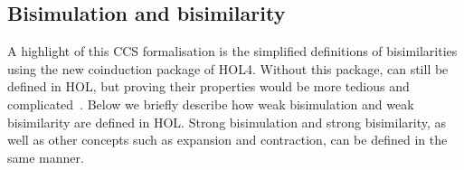 \documentclass[GCNS]{yincog}
\theoremstyle{remark}
\theoremstyle{theorem}
\theoremstyle{remark}
\begin{document}
\subsection{Bisimulation and bisimilarity}
 \label{ss:bb}

A highlight of this CCS formalisation is the simplified definitions of
bisimilarities using the new coinduction package of HOL4. Without this
package,  can still be defined in HOL, but proving their properties
would be more tedious and complicated~\citep[p.~91]{Mil89}. Below we briefly
describe how weak bisimulation and weak bisimilarity are defined in HOL.
Strong bisimulation and strong bisimilarity, as well as other concepts
such as expansion and contraction, can be defined in the same manner.
\end{document}

